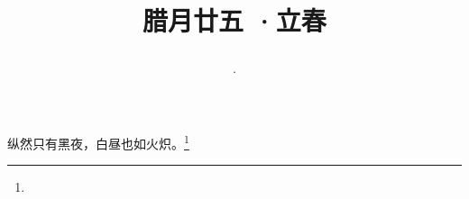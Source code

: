 \title{\date[d=4,m=2,y=2024][year:cn-y,年,month:cn,day:cn,日,·,weekday]·腊月廿五 ·立春}
纵然只有黑夜，白昼也如火炽。\footnote{ }

